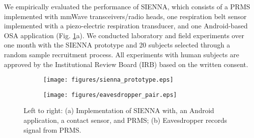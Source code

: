 We empirically evaluated the performance of SIENNA, which consists of a PRMS implemented with mmWave transceivers/radio heads, one respiration belt sensor implemented with a piezo-electric respiration transducer, and one Android-based OSA application (Fig. \ref{fig:experiment}a). We conducted laboratory and field experiments over one month with the SIENNA prototype and 20 subjects selected through a random sample recruitment process. All experiments with human subjects are approved by the Institutional Review Board (IRB) based on the written consent.

\begin{figure}[h]
\begin{subfigure}[t]{0.23\textwidth}
\texttt{[image: figures/sienna\_prototype.eps]}
\end{subfigure}
\hspace{\fill}
\begin{subfigure}[t]{0.23\textwidth}
\texttt{[image: figures/eavesdropper\_pair.eps]}
\end{subfigure}
\caption{Left to right: (a) Implementation of SIENNA with, an Android application, a contact sensor, and PRMS; (b) Eavesdropper records signal from PRMS.}
\label{fig:experiment}
\end{figure}


